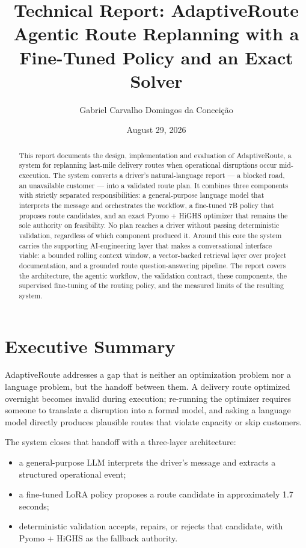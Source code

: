 \documentclass[11pt,a4paper]{article}
\title{Technical Report: AdaptiveRoute\\
\large Agentic Route Replanning with a Fine-Tuned Policy and an Exact Solver}
\author{Gabriel Carvalho Domingos da Conceição}
\date{August 29, 2026}
\begin{document}
\maketitle

\begin{abstract}
This report documents the design, implementation and evaluation of AdaptiveRoute, a system for
replanning last-mile delivery routes when operational disruptions occur mid-execution. The system
converts a driver's natural-language report --- a blocked road, an unavailable customer --- into a
validated route plan. It combines three components with strictly separated responsibilities: a
general-purpose language model that interprets the message and orchestrates the workflow, a
fine-tuned 7B policy that proposes route candidates, and an exact Pyomo + HiGHS optimizer that
remains the sole authority on feasibility. No plan reaches a driver without passing deterministic
validation, regardless of which component produced it. Around this core the system carries the
supporting AI-engineering layer that makes a conversational interface viable: a bounded rolling
context window, a vector-backed retrieval layer over project documentation, and a grounded route
question-answering pipeline. The report covers the architecture, the agentic workflow, the validation
contract, these components, the supervised fine-tuning of the routing policy, and the measured limits
of the resulting system.
\end{abstract}

\tableofcontents

\section{Executive Summary}

AdaptiveRoute addresses a gap that is neither an optimization problem nor a language problem, but
the handoff between them. A delivery route optimized overnight becomes invalid during execution;
re-running the optimizer requires someone to translate a disruption into a formal model, and asking
a language model directly produces plausible routes that violate capacity or skip customers.

The system closes that handoff with a three-layer architecture:

\begin{itemize}
  \item a general-purpose LLM interprets the driver's message and extracts a structured operational
        event;
  \item a fine-tuned LoRA policy proposes a route candidate in approximately 1.7 seconds;
  \item deterministic validation accepts, repairs, or rejects that candidate, with Pyomo + HiGHS as
        the fallback authority.
\end{itemize}
\end{document}
